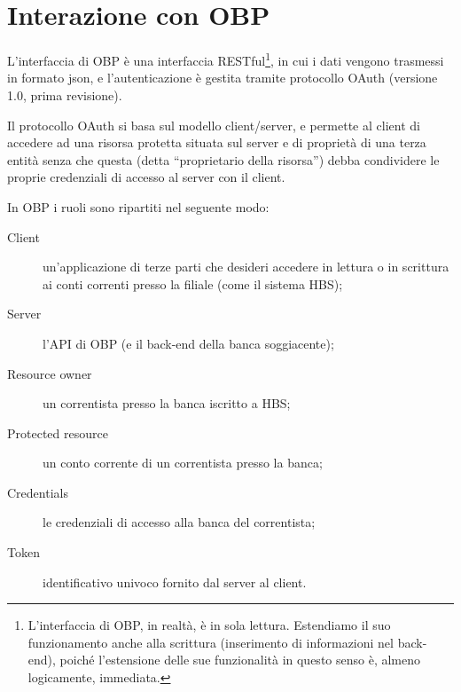 
\section{Interazione con OBP}

L'interfaccia di OBP è una interfaccia RESTful\footnote{L'interfaccia di OBP, in realtà, è in sola lettura. Estendiamo il suo funzionamento anche alla scrittura (inserimento di informazioni nel back-end), poiché l'estensione delle sue funzionalità in questo senso è, almeno logicamente, immediata.}, in cui i dati vengono trasmessi in formato json, e l'autenticazione è gestita tramite protocollo OAuth\cite{oauthrfc} (versione 1.0, prima revisione).

Il protocollo OAuth si basa sul modello client/server, e permette al client di accedere ad una risorsa protetta situata sul server e di propriet\`a di una terza entit\`a senza che questa (detta ``proprietario della risorsa'') debba condividere le proprie credenziali di accesso al server con il client.

In OBP i ruoli sono ripartiti nel seguente modo:
\begin{description}
	\item[Client] un'applicazione di terze parti che desideri accedere in lettura o in scrittura ai conti correnti presso la filiale (come il sistema HBS);
	\item[Server] l'API di OBP (e il back-end della banca soggiacente);
	\item[Resource owner] un correntista presso la banca iscritto a HBS;
	\item[Protected resource] un conto corrente di un correntista presso la banca;
	\item[Credentials] le credenziali di accesso alla banca del correntista;
	\item[Token] identificativo univoco fornito dal server al client.
\end{description}

